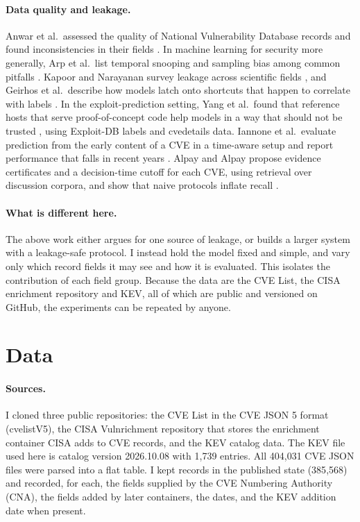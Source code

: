 \documentclass[conference,a4paper]{IEEEtran}
\begin{document}
\paragraph{Data quality and leakage.} Anwar et al.\ assessed the quality of National Vulnerability Database records and found inconsistencies in their fields \cite{anwar2022}. In machine learning for security more generally, Arp et al.\ list temporal snooping and sampling bias among common pitfalls \cite{arp2022}. Kapoor and Narayanan survey leakage across scientific fields \cite{kapoor2023}, and Geirhos et al.\ describe how models latch onto shortcuts that happen to correlate with labels \cite{geirhos2020}. In the exploit-prediction setting, Yang et al.\ found that reference hosts that serve proof-of-concept code help models in a way that should not be trusted \cite{yang2020}, using Exploit-DB labels and cvedetails data. Iannone et al.\ evaluate prediction from the early content of a CVE in a time-aware setup and report performance that falls in recent years \cite{iannone2024}. Alpay and Alpay propose evidence certificates and a decision-time cutoff for each CVE, using retrieval over discussion corpora, and show that naive protocols inflate recall \cite{alpay2026}.

\paragraph{What is different here.} The above work either argues for one source of leakage, or builds a larger system with a leakage-safe protocol. I instead hold the model fixed and simple, and vary only which record fields it may see and how it is evaluated. This isolates the contribution of each field group. Because the data are the CVE List, the CISA enrichment repository and KEV, all of which are public and versioned on GitHub, the experiments can be repeated by anyone.

\section{Data}

\paragraph{Sources.} I cloned three public repositories: the CVE List in the CVE JSON 5 format (cvelistV5), the CISA Vulnrichment repository that stores the enrichment container CISA adds to CVE records, and the KEV catalog data. The KEV file used here is catalog version 2026.10.08 with 1{,}739 entries. All 404{,}031 CVE JSON files were parsed into a flat table. I kept records in the published state (385{,}568) and recorded, for each, the fields supplied by the CVE Numbering Authority (CNA), the fields added by later containers, the dates, and the KEV addition date when present.
\end{document}
